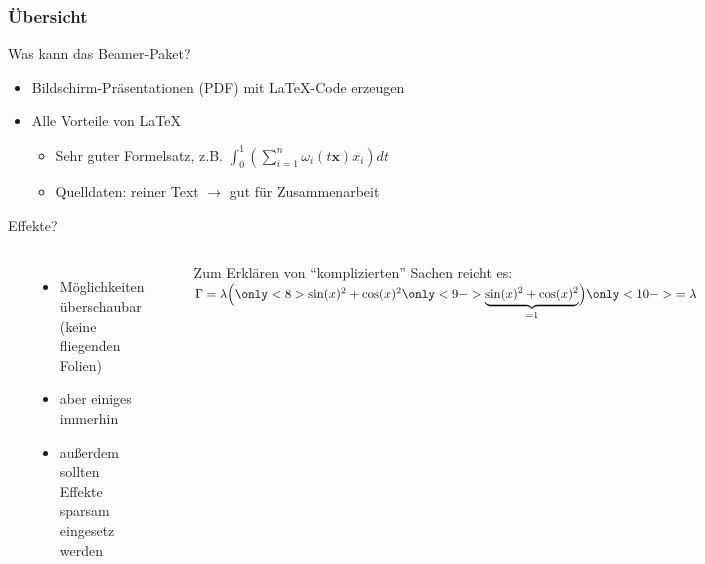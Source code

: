 \documentclass{beamer}
\begin{document}
\begin{frame}[label=beamer]
  \frametitle{Übersicht}

Was kann das Beamer-Paket?
  \begin{itemize}
  \item Bildschirm-Präsentationen (PDF) mit \LaTeX{}-Code erzeugen
  \pause
  \item Alle Vorteile von \LaTeX
  \begin{itemize}
   \item Sehr guter Formelsatz, z.B. $\int_0^1\left(\sum_{i=1}^n \omega_i(t \mathbf x) x_i\right)dt$
   \item Quelldaten: reiner Text $\rightarrow$ gut für Zusammenarbeit
  \end{itemize}
 \end{itemize}

  \bigskip
  
  \pause
Effekte?
\begin{columns}
~

  \begin{itemize}
    \item Möglichkeiten überschaubar\\
    (keine fliegenden Folien)
    
    \pause
    
    \item aber einiges  immerhin
    \pause
    \pause
    \item {außerdem sollten Effekte sparsam eingesetz werden}
    \end{itemize}
%

~


\pause
\pause

Zum Erklären von "`komplizierten"' Sachen reicht es:\\[2em]


$\Gamma =\lambda
	\Big(
           \only<8>{\sin(x)^2 + \cos(x)^2}
           \only<9->{\underbrace{\sin(x)^2 + \cos(x)^2}_{= 1}}
	\Big)
	\only<10->{=\lambda}
       $
%  
\end{columns}
\end{frame}

\end{document}
